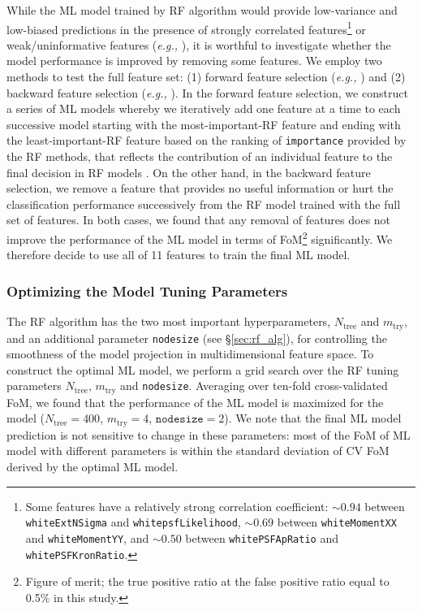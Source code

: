 \documentclass[twocolumn]{aastex62}
\begin{document}
{While the ML model trained by RF algorithm 
would provide low-variance and low-biased predictions 
in the presence of strongly correlated features\footnote{Some features have a relatively strong correlation coefficient: 
$\sim0.94$ between \texttt{whiteExtNSigma} and \texttt{whitepsfLikelihood}, 
$\sim0.69$ between \texttt{whiteMomentXX} and \texttt{whiteMomentYY}, and 
$\sim0.50$ between \texttt{whitePSFApRatio} and \texttt{whitePSFKronRatio}. }
 or weak/uninformative features ({\it e.g.,} \citealt{Richards12a}), 
it is worthful to investigate whether the model performance is improved by removing some features. 
We employ two methods to test the full feature set: 
(1) forward feature selection ({\it e.g.,} \citealt{Richards12a, Miller17}) and 
(2) backward feature selection ({\it e.g.,} \citealt{Brink13}). 
In the forward feature selection, 
we construct a series of ML models whereby we iteratively add one feature 
at a time to each successive model starting with the most-important-RF feature 
and ending with the least-important-RF feature 
based on the ranking of \texttt{importance} provided by the RF methods, 
that reflects the contribution of an individual feature to the final decision in RF models \citep{Breiman01, Breiman02}. 
On the other hand, in the backward feature selection, 
we remove a feature that provides no
useful information or hurt the classification performance 
successively from the RF model trained with the full set of features. 
In both cases, we found that any removal of features does not improve the performance of the ML model 
in terms of FoM\footnote{Figure of merit; the true positive ratio at the false positive ratio equal to 0.5\% in this study. } 
significantly. 
We therefore decide to use all of 11 features to train the final ML model. 

\subsubsection{Optimizing the Model Tuning Parameters}
The RF algorithm has the two most important hyperparameters, $N_{\mathrm{tree}}$ and $m_{\mathrm{try}}$, 
and an additional parameter \texttt{nodesize} (see \S\ref{sec:rf_alg}), 
for controlling the smoothness of the model projection in multidimensional feature space. 
To construct the optimal ML model, we perform a grid search over the RF tuning parameters 
$N_{\mathrm{tree}}$, $m_{\mathrm{try}}$ and \texttt{nodesize}. 
Averaging over ten-fold cross-validated FoM, 
we found that the performance of the ML model is maximized for the model 
($N_{\mathrm{tree}} = 400$, $m_{\mathrm{try}} = 4$, $\mathtt{nodesize} = 2$). 
We note that the final ML model prediction is not sensitive to change in these parameters: 
most of the FoM of ML model with different parameters is within the standard deviation 
of CV FoM derived by the optimal ML model. 
}
\end{document}
